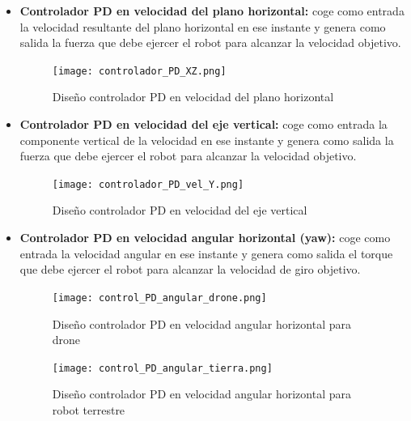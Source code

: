 \begin{itemize}
    \item \textbf{Controlador PD en velocidad del plano horizontal:} coge como entrada la velocidad resultante del plano horizontal en ese instante y genera como salida la fuerza que debe ejercer el robot para alcanzar la velocidad objetivo. 
    
    \begin{figure}[h!]
    \centering
    \texttt{[image: controlador\_PD\_XZ.png]}
    \caption[Diseño controlador PD en velocidad del plano horizontal]{Diseño controlador PD en velocidad del plano horizontal\footnotemark}
    \label{fig:esquema_pd_1}
    \end{figure}
    
    \item \textbf{Controlador PD en velocidad del eje vertical:} coge como entrada la componente vertical de la velocidad en ese instante y genera como salida la fuerza que debe ejercer el robot para alcanzar la velocidad objetivo. 
    
    \begin{figure}[h!]
    \centering
    \texttt{[image: controlador\_PD\_vel\_Y.png]}
\caption[Diseño controlador PD en velocidad del eje vertical]{Diseño controlador PD en velocidad del eje vertical\footnotemark}
    \label{fig:esquema_pd_2}
    \end{figure}
    
    \item \textbf{Controlador PD en velocidad angular horizontal (yaw):} coge como entrada la velocidad angular en ese instante y genera como salida el torque que debe ejercer el robot para alcanzar la velocidad de giro objetivo. 
    
    \clearpage
    \begin{figure}[h!]
    \centering
    \texttt{[image: control\_PD\_angular\_drone.png]}
\caption[Diseño controlador PD en velocidad angular horizontal para drone]{Diseño controlador PD en velocidad angular horizontal para drone\footnotemark}
    \label{fig:esquema_pd_3}
    \end{figure}

    \begin{figure}[h!]
    \centering
    \texttt{[image: control\_PD\_angular\_tierra.png]}
\caption[Diseño controlador PD en velocidad angular horizontal para robot terrestre]{Diseño controlador PD en velocidad angular horizontal para robot terrestre\footnotemark}
    \label{fig:esquema_pd_4}
    \end{figure} 
    

\end{itemize}

